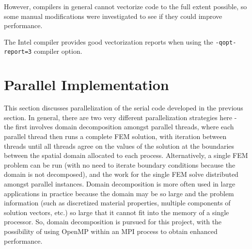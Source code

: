 \documentclass[10pt]{article}
\begin{document}
However, compilers in general cannot vectorize code to the full extent possible, so some manual modifications were investigated to see if they could improve performance. 





The Intel compiler provides good vectorization reports when using the {\tt -qopt-report=3} compiler option. 

\section{Parallel Implementation}
This section discusses parallelization of the serial code developed in the previous section. In general, there are two very different parallelization strategies here - the first involves domain decomposition amongst parallel threads, where each parallel thread then runs a complete FEM solution, with iteration between threads until all threads agree on the values of the solution at the boundaries between the spatial domain allocated to each process. Alternatively, a single FEM problem can be run (with no need to iterate boundary conditions because the domain is not decomposed), and the work for the single FEM solve distributed amongst parallel instances. Domain decomposition is more often used in large applications in practice because the domain may be so large and the problem information (such as discretized material properties, multiple components of solution vectors, etc.) so large that it cannot fit into the memory of a single processor. So, domain decomposition is pursued for this project, with the possibility of using OpenMP within an MPI process to obtain enhanced performance.
\end{document}
